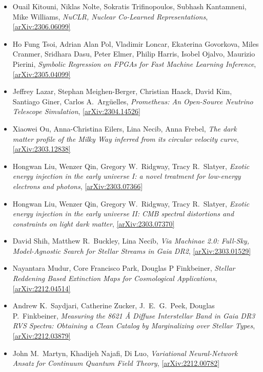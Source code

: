 \begin{itemize}
\item Ouail Kitouni, Niklas Nolte, Sokratis Trifinopoulos, Subhash Kantamneni, Mike Williams, \textit{NuCLR, Nuclear Co-Learned Representations}, \href{https://arxiv.org/abs/2306.06099}{[arXiv:2306.06099]} 
\item Ho Fung Tsoi, Adrian Alan Pol, Vladimir Loncar, Ekaterina Govorkova, Miles Cranmer, Sridhara Dasu, Peter Elmer, Philip Harris, Isobel Ojalvo, Maurizio Pierini, \textit{Symbolic Regression on FPGAs for Fast Machine Learning Inference}, \href{https://arxiv.org/abs/2305.04099}{[arXiv:2305.04099]} 
\item Jeffrey Lazar, Stephan Meighen-Berger, Christian Haack, David Kim, Santiago Giner, Carlos A.\  Argüelles, \textit{Prometheus: An Open-Source Neutrino Telescope Simulation}, \href{https://arxiv.org/abs/2304.14526}{[arXiv:2304.14526]} 
\item Xiaowei Ou, Anna-Christina Eilers, Lina Necib, Anna Frebel, \textit{The dark matter profile of the Milky Way inferred from its circular velocity curve}, \href{https://arxiv.org/abs/2303.12838}{[arXiv:2303.12838]} 
\item Hongwan Liu, Wenzer Qin, Gregory W.\  Ridgway, Tracy R.\  Slatyer, \textit{Exotic energy injection in the early universe I: a novel treatment for low-energy electrons and photons}, \href{https://arxiv.org/abs/2303.07366}{[arXiv:2303.07366]} 
\item Hongwan Liu, Wenzer Qin, Gregory W.\  Ridgway, Tracy R.\  Slatyer, \textit{Exotic energy injection in the early universe II: CMB spectral distortions and constraints on light dark matter}, \href{https://arxiv.org/abs/2303.07370}{[arXiv:2303.07370]} 
\item David Shih, Matthew R.\  Buckley, Lina Necib, \textit{Via Machinae 2.0: Full-Sky, Model-Agnostic Search for Stellar Streams in Gaia DR2}, \href{https://arxiv.org/abs/2303.01529}{[arXiv:2303.01529]} 
\item Nayantara Mudur, Core Francisco Park, Douglas P Finkbeiner, \textit{Stellar Reddening Based Extinction Maps for Cosmological Applications}, \href{https://arxiv.org/abs/2212.04514}{[arXiv:2212.04514]} 
\item Andrew K.\  Saydjari, Catherine Zucker, J.\  E.\  G.\  Peek, Douglas P.\  Finkbeiner, \textit{Measuring the 8621 Å Diffuse Interstellar Band in Gaia DR3 RVS Spectra: Obtaining a Clean Catalog by Marginalizing over Stellar Types}, \href{https://arxiv.org/abs/2212.03879}{[arXiv:2212.03879]} 
\item John M.\  Martyn, Khadijeh Najafi, Di Luo, \textit{Variational Neural-Network Ansatz for Continuum Quantum Field Theory}, \href{https://arxiv.org/abs/2212.00782}{[arXiv:2212.00782]} 

\end{itemize}

